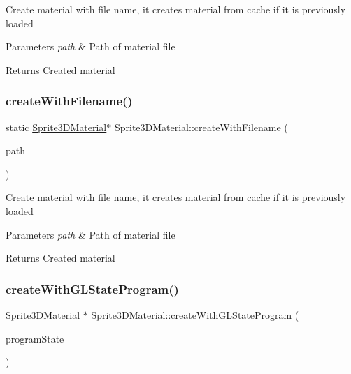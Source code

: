Create material with file name, it creates material from cache if it is previously loaded 
\begin{DoxyParams}{Parameters}
{\em path} & Path of material file \\
\hline
\end{DoxyParams}
\begin{DoxyReturn}{Returns}
Created material 
\end{DoxyReturn}
\mbox{\label{classSprite3DMaterial_ab36bcb7f2afab5bccd5dbe6e7c6e0b98}} 
\subsubsection{\texorpdfstring{create\+With\+Filename()}{createWithFilename()}\hspace{0.1cm}{\footnotesize\ttfamily [2/2]}}
{\footnotesize\ttfamily static \hyperlink{classSprite3DMaterial}{Sprite3\+D\+Material}$\ast$ Sprite3\+D\+Material\+::create\+With\+Filename (\begin{DoxyParamCaption}\item[{const std\+::string \&}]{path }\end{DoxyParamCaption})\hspace{0.3cm}{\ttfamily [static]}}

Create material with file name, it creates material from cache if it is previously loaded 
\begin{DoxyParams}{Parameters}
{\em path} & Path of material file \\
\hline
\end{DoxyParams}
\begin{DoxyReturn}{Returns}
Created material 
\end{DoxyReturn}
\mbox{\label{classSprite3DMaterial_a772f63c64eb9c9a8b78d0d7e7b479752}} 
\subsubsection{\texorpdfstring{create\+With\+G\+L\+State\+Program()}{createWithGLStateProgram()}\hspace{0.1cm}{\footnotesize\ttfamily [1/2]}}
{\footnotesize\ttfamily \hyperlink{classSprite3DMaterial}{Sprite3\+D\+Material} $\ast$ Sprite3\+D\+Material\+::create\+With\+G\+L\+State\+Program (\begin{DoxyParamCaption}\item[{\hyperlink{classGLProgramState}{G\+L\+Program\+State} $\ast$}]{program\+State }\end{DoxyParamCaption})\hspace{0.3cm}{\ttfamily [static]}}

